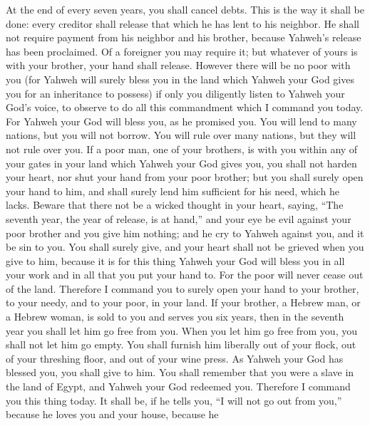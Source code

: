  At the end of every seven years, you shall cancel debts.
 This is the way it shall be done: every creditor shall
release that which he has lent to his neighbor. He shall not require
payment from his neighbor and his brother, because Yahweh's release has
been proclaimed.  Of a foreigner you may require it; but
whatever of yours is with your brother, your hand shall release.
 However there will be no poor with you (for Yahweh will
surely bless you in the land which Yahweh your God gives you for an
inheritance to possess)  if only you diligently listen to
Yahweh your God's voice, to observe to do all this commandment which I
command you today.  For Yahweh your God will bless you, as
he promised you. You will lend to many nations, but you will not borrow.
You will rule over many nations, but they will not rule over you.
 If a poor man, one of your brothers, is with you within
any of your gates in your land which Yahweh your God gives you, you
shall not harden your heart, nor shut your hand from your poor brother;
 but you shall surely open your hand to him, and shall
surely lend him sufficient for his need, which he lacks. 
Beware that there not be a wicked thought in your heart, saying, ``The
seventh year, the year of release, is at hand,'' and your eye be evil
against your poor brother and you give him nothing; and he cry to Yahweh
against you, and it be sin to you.  You shall surely
give, and your heart shall not be grieved when you give to him, because
it is for this thing Yahweh your God will bless you in all your work and
in all that you put your hand to.  For the poor will
never cease out of the land. Therefore I command you to surely open your
hand to your brother, to your needy, and to your poor, in your land.
 If your brother, a Hebrew man, or a Hebrew woman, is
sold to you and serves you six years, then in the seventh year you shall
let him go free from you.  When you let him go free from
you, you shall not let him go empty.  You shall furnish
him liberally out of your flock, out of your threshing floor, and out of
your wine press. As Yahweh your God has blessed you, you shall give to
him.  You shall remember that you were a slave in the
land of Egypt, and Yahweh your God redeemed you. Therefore I command you
this thing today.  It shall be, if he tells you, ``I will
not go out from you,'' because he loves you and your house, because he
